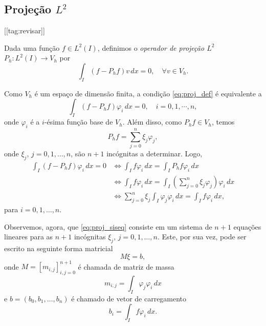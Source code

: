 \subsection{Projeção $L^2$}\label{subsec:projecao_1d}
[[tag:revisar]]

Dada uma função $f\in L^2(I)$, definimos o \emph{operador de projeção $L^2$} $P_h:L^2(I)\to V_h$ por
\begin{equation}\label{eq:proj_def}
  \int_I (f-P_hf)v\,dx=0,\quad\forall v\in V_h.
\end{equation}

Como $V_h$ é um espaço de dimensão finita, a condição \eqref{eq:proj_def} é equivalente a
\begin{equation}\label{eq:proj_def}
  \int_I (f-P_hf)\varphi_i\,dx=0,\quad i=0, 1, \cdots, n,
\end{equation}
onde $\varphi_i$ é a $i$-ésima função base de $V_h$. Além disso, como $P_hf\in V_h$, temos
\begin{equation}
  P_hf = \sum_{j=0}^n\xi_j\varphi_j,
\end{equation}
onde $\xi_j$, $j=0, 1, \dotsc, n$, são $n+1$ incógnitas a determinar. Logo,
\begin{align}
  \int_I (f-P_hf)\varphi_i\,dx=0 &\Leftrightarrow \int_I f\varphi_i\,dx = \int_I P_hf\varphi_i\,dx\\
  &\Leftrightarrow \int_I f\varphi_i\,dx = \int_I \left(\sum_{j=0}^n \xi_j\varphi_j\right)\varphi_i\,dx\\
  &\Leftrightarrow \sum_{j=0}^n \xi_j\int_I\varphi_j\varphi_i\,dx = \int_I f\varphi_i\,dx,\label{eq:proj_siseq}
\end{align}
para $i=0, 1, \dotsc, n$.

Observemos, agora, que \eqref{eq:proj_siseq} consiste em um sistema de $n+1$ equações lineares para as $n+1$ incógnitas $\xi_j$, $j=0, 1, \dotsc, n$. Este, por sua vez, pode ser escrito na seguinte forma matricial
\begin{equation}\label{eq:proj_sis}
  M\xi = b,
\end{equation}
onde $M = [m_{i,j}]_{i,j=0}^{n+1}$ é chamada de matriz de massa
\begin{equation}
  m_{i,j} = \int_I\varphi_j\varphi_i\,dx
\end{equation}
e $b = (b_0, b_1, \dotsc, b_n)$ é chamado de vetor de carregamento
\begin{equation}
  b_i = \int_I f\varphi_i\,dx.
\end{equation}

